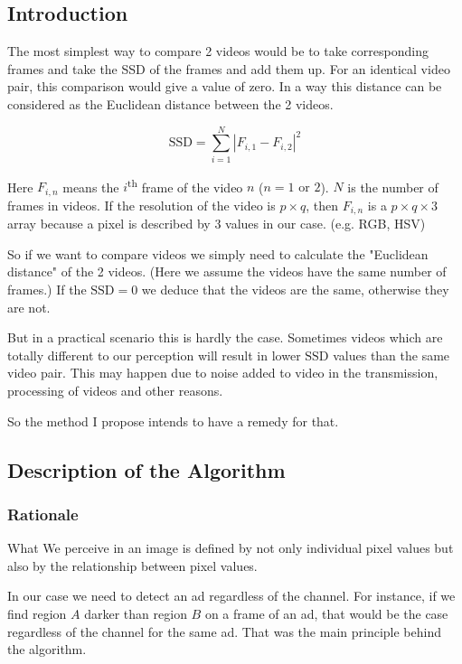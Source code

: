 \subsection{Introduction}
The most simplest way to compare 2 videos would be to take corresponding frames and take the SSD of the frames and add them up. For an identical video pair, this comparison would give a value of zero. In a way this distance can be considered as the Euclidean distance between the 2 videos.

\begin{equation}
\text{SSD}=\sum_{i=1}^N |F_{i,1}-F_{i,2}|^2
\end{equation}

Here $F_{i,n}$ means the $i$\textsuperscript{th} frame of the video $n$ ($n=1\text{ or } 2$). $N$ is the number of frames in videos. If the resolution of the video is $p\times q$, then $F_{i,n}$ is a $p\times q \times 3$ array because a pixel is described by $3$ values in our case. (e.g. RGB, HSV) 

So if we want to compare videos we simply need to calculate the "Euclidean distance" of the 2 videos. (Here we assume the videos have the same number of frames.) If the $\text{SSD}=0$ we deduce that the videos are the same, otherwise they are not.

But in a practical scenario this is hardly the case. Sometimes videos which are totally different to our perception will result in lower $\text{SSD}$ values than the same video pair. This may happen due to noise added to video in the transmission, processing of videos and other reasons.

So the method I propose intends to have a remedy for that.

\subsection{Description of the Algorithm}

\subsubsection{Rationale}
What We perceive in an image is defined by not only individual pixel values but also by the relationship between pixel values.

In our case we need to detect an ad regardless of the channel. For instance, if we find region $A$ darker than region $B$ on a frame of an ad, that would be the case regardless of the channel for the same ad. That was the main principle behind the algorithm.


